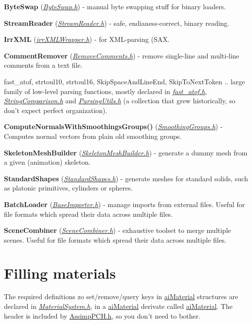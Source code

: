 \begin{DoxyItemize}
\item {\bfseries Byte\+Swap} ({\itshape \hyperlink{_byte_swap_8h_source}{Byte\+Swap.\+h}}) -\/ manual byte swapping stuff for binary loaders. 
\item {\bfseries Stream\+Reader} ({\itshape \hyperlink{_stream_reader_8h_source}{Stream\+Reader.\+h}}) -\/ safe, endianess-\/correct, binary reading. 
\item {\bfseries Irr\+X\+M\+L} ({\itshape \hyperlink{irr_x_m_l_wrapper_8h_source}{irr\+X\+M\+L\+Wrapper.\+h}}) -\/ for X\+M\+L-\/parsing (S\+A\+X. 
\item {\bfseries Comment\+Remover} ({\itshape \hyperlink{_remove_comments_8h_source}{Remove\+Comments.\+h}}) -\/ remove single-\/line and multi-\/line comments from a text file. 
\item fast\+\_\+atof, strtoul10, strtoul16, Skip\+Space\+And\+Line\+End, Skip\+To\+Next\+Token .. large family of low-\/level parsing functions, mostly declared in {\itshape \hyperlink{fast__atof_8h_source}{fast\+\_\+atof.\+h}}, {\itshape \hyperlink{_string_comparison_8h_source}{String\+Comparison.\+h}} and {\itshape \hyperlink{_parsing_utils_8h}{Parsing\+Utils.\+h}} (a collection that grew historically, so don't expect perfect organization).  
\item {\bfseries Compute\+Normals\+With\+Smoothings\+Groups()} ({\itshape \hyperlink{_smoothing_groups_8h_source}{Smoothing\+Groups.\+h}}) -\/ Computes normal vectors from plain old smoothing groups.  
\item {\bfseries Skeleton\+Mesh\+Builder} ({\itshape \hyperlink{_skeleton_mesh_builder_8h}{Skeleton\+Mesh\+Builder.\+h}}) -\/ generate a dummy mesh from a given (animation) skeleton.  
\item {\bfseries Standard\+Shapes} ({\itshape \hyperlink{_standard_shapes_8h_source}{Standard\+Shapes.\+h}}) -\/ generate meshes for standard solids, such as platonic primitives, cylinders or spheres.  
\item {\bfseries Batch\+Loader} ({\itshape \hyperlink{_base_importer_8h_source}{Base\+Importer.\+h}}) -\/ manage imports from external files. Useful for file formats which spread their data across multiple files.  
\item {\bfseries Scene\+Combiner} ({\itshape \hyperlink{_scene_combiner_8h_source}{Scene\+Combiner.\+h}}) -\/ exhaustive toolset to merge multiple scenes. Useful for file formats which spread their data across multiple files.  
\end{DoxyItemize}\hypertarget{extend_mat}{}\section{Filling materials}\label{extend_mat}
The required definitions zo set/remove/query keys in \hyperlink{classai_material}{ai\+Material} structures are declared in {\itshape \hyperlink{_material_system_8h}{Material\+System.\+h}}, in a \hyperlink{classai_material}{ai\+Material} derivate called \hyperlink{classai_material}{ai\+Material}. The header is included by \hyperlink{_assimp_p_c_h_8h}{Assimp\+P\+C\+H.\+h}, so you don't need to bother.


